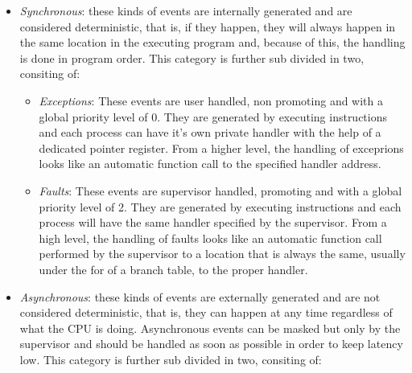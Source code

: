 \documentclass{article}
\begin{document}
        \begin{itemize}

            \item \textit{Synchronous}: these kinds of events are internally generated and are considered deterministic, that is, if they happen, they will always happen in the same location in the executing program and, because of this, the handling is done in program order. This category is further sub divided in two, consiting of:

                \begin{itemize}

                    \item \textit{Exceptions}: These events are user handled, non promoting and with a global priority level of 0. They are generated by executing instructions and each process can have it's own private handler with the help of a dedicated pointer register. From a higher level, the handling of exceprions looks like an automatic function call to the specified handler address.
                    \item \textit{Faults}: These events are supervisor handled, promoting and with a global priority level of 2. They are generated by executing instructions and each process will have the same handler specified by the supervisor. From a high level, the handling of faults looks like an automatic function call performed by the supervisor to a location that is always the same, usually under the for of a branch table, to the proper handler.

                \end{itemize}

            \item \textit{Asynchronous}: these kinds of events are externally generated and are not considered deterministic, that is, they can happen at any time regardless of what the CPU is doing. Asynchronous events can be masked but only by the supervisor and should be handled as soon as possible in order to keep latency low. This category is further sub divided in two, consiting of:

            \begin{itemize}


\end{itemize}
\end{itemize}
\end{document}
